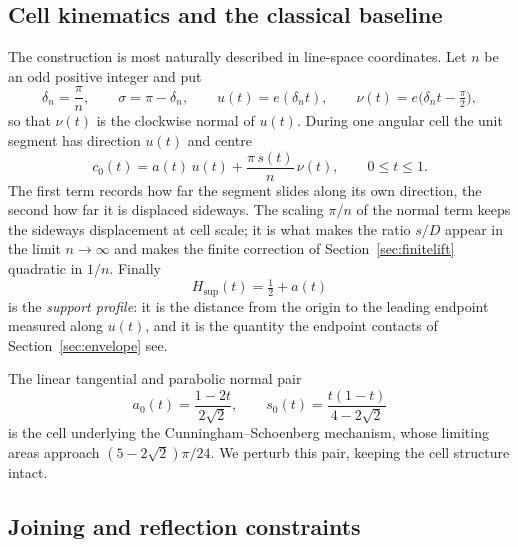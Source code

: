 \documentclass[11pt]{article}
\theoremstyle{plain}
\theoremstyle{definition}
\theoremstyle{remark}
\newcommand{\Hsup}{H_{\mathrm{sup}}}
\begin{document}
\subsection{Cell kinematics and the classical baseline}

The construction is most naturally described in line-space coordinates. Let
$n$ be an odd positive integer and put
\[
  \delta_{n}=\frac{\pi}{n},\qquad \sigma=\pi-\delta_{n},
  \qquad
  u(t)=e(\delta_{n} t),\qquad \nu(t)=e\bigl(\delta_{n} t-\tfrac{\pi}{2}\bigr),
\]
so that $\nu(t)$ is the clockwise normal of $u(t)$. During one angular cell the
unit segment has direction $u(t)$ and centre
\begin{equation}\label{eq:c0}
  c_{0}(t)=a(t)\,u(t)+\frac{\pi\,s(t)}{n}\,\nu(t),
  \qquad 0\le t\le 1 .
\end{equation}
The first term records how far the segment slides along its own direction, the
second how far it is displaced sideways. The scaling $\pi/n$ of the normal term
keeps the sideways displacement at cell scale; it is what makes the ratio
$s/D$ appear in the limit $n\to\infty$ and makes the finite correction of
Section~\ref{sec:finitelift} quadratic in $1/n$. Finally
\begin{equation}\label{eq:hprofile}
  \Hsup(t)=\tfrac12+a(t)
\end{equation}
is the \emph{support profile}: it is the distance from the origin to the leading
endpoint measured along $u(t)$, and it is the quantity the endpoint contacts of
Section~\ref{sec:envelope} see.

The linear tangential and parabolic normal pair
\begin{equation}\label{eq:baseline}
  a_{0}(t)=\frac{1-2t}{2\sqrt2},
  \qquad
  s_{0}(t)=\frac{t(1-t)}{4-2\sqrt2}
\end{equation}
is the cell underlying the Cunningham--Schoenberg mechanism, whose limiting
areas approach $(5-2\sqrt2)\pi/24$. We perturb this pair, keeping the cell
structure intact.

\subsection{Joining and reflection constraints}
\end{document}

